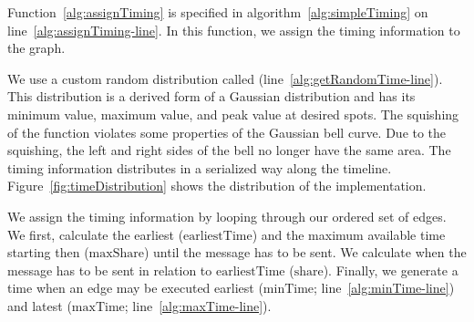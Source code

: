 Function~\ref{alg:assignTiming} is specified in algorithm~\ref{alg:simpleTiming} on line~\ref{alg:assignTiming-line}. In this function, we assign the timing information to the graph. 

We use a custom random distribution called  (line~\ref{alg:getRandomTime-line}). This distribution is a derived form of a Gaussian distribution and has its minimum value, maximum value, and peak value at desired spots. The squishing of the function violates some properties of the Gaussian bell curve. Due to the squishing, the left and right sides of the bell no longer have the same area. The timing information distributes in a serialized way along the timeline. Figure~\ref{fig:timeDistribution} shows the distribution of the implementation.

\begin{figure*}[ht]
	\centering
	
	\caption{Distribution of (90, 120, 200) in algorithm~\ref{alg:simpleTiming}}
	\label{fig:timeDistribution}
\end{figure*}

We assign the timing information by looping through our ordered set of edges. We first, calculate the earliest ($\text{earliestTime}$) and the maximum available time starting then ($\text{maxShare}$) until the message has to be sent. We calculate when the message has to be sent in relation to $\text{earliestTime}$ ($\text{share}$). Finally, we generate a time when an edge may be executed earliest ($\text{minTime}$; line~\ref{alg:minTime-line}) and latest ($\text{maxTime}$; line~\ref{alg:maxTime-line}).


